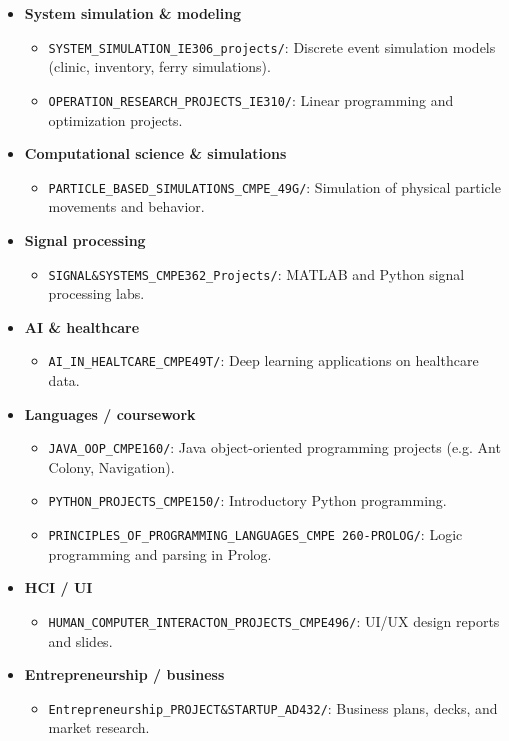 \documentclass[11pt]{article}
\begin{document}
\begin{itemize}
    \item \textbf{System simulation \& modeling}
    \begin{itemize}
        \item \texttt{SYSTEM\_SIMULATION\_IE306\_projects/}: Discrete event simulation models (clinic, inventory, ferry simulations).
        \item \texttt{OPERATION\_RESEARCH\_PROJECTS\_IE310/}: Linear programming and optimization projects.
    \end{itemize}

    \item \textbf{Computational science \& simulations}
    \begin{itemize}
        \item \texttt{PARTICLE\_BASED\_SIMULATIONS\_CMPE\_49G/}: Simulation of physical particle movements and behavior.
    \end{itemize}

    \item \textbf{Signal processing}
    \begin{itemize}
        \item \texttt{SIGNAL\&SYSTEMS\_CMPE362\_Projects/}: MATLAB and Python signal processing labs.
    \end{itemize}

    \item \textbf{AI \& healthcare}
    \begin{itemize}
        \item \texttt{AI\_IN\_HEALTCARE\_CMPE49T/}: Deep learning applications on healthcare data.
    \end{itemize}
    
    \item \textbf{Languages / coursework}
    \begin{itemize}
        \item \texttt{JAVA\_OOP\_CMPE160/}: Java object-oriented programming projects (e.g. Ant Colony, Navigation).
        \item \texttt{PYTHON\_PROJECTS\_CMPE150/}: Introductory Python programming.
        \item \texttt{PRINCIPLES\_OF\_PROGRAMMING\_LANGUAGES\_CMPE 260-PROLOG/}: Logic programming and parsing in Prolog.
    \end{itemize}
    
    \item \textbf{HCI / UI}
    \begin{itemize}
        \item \texttt{HUMAN\_COMPUTER\_INTERACTON\_PROJECTS\_CMPE496/}: UI/UX design reports and slides.
    \end{itemize}
    
    \item \textbf{Entrepreneurship / business}
    \begin{itemize}
        \item \texttt{Entrepreneurship\_PROJECT\&STARTUP\_AD432/}: Business plans, decks, and market research.
    \end{itemize}
\end{itemize}
\end{document}
